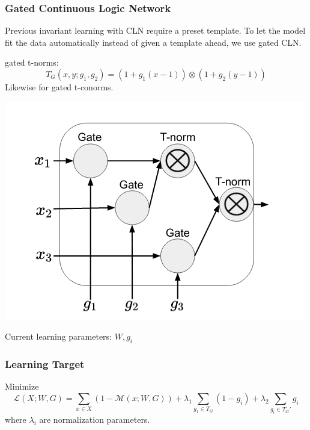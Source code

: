 \documentclass[11pt]{beamer}
\begin{document}
\begin{frame}\frametitle{Gated Continuous Logic Network}
Previous invariant learning with CLN require a preset template. To let the model fit the data automatically instead of given a template ahead, we use gated CLN.

gated t-norms:
\[T_G(x,y;g_1,g_2) = (1 + g_1(x - 1))\otimes (1 + g_2(y - 1)) \]
Likewise for gated t-conorms.

\begin{center}
\includegraphics[scale=0.35]{7.png}
\end{center}
Current learning parameters: $W, g_i$
\end{frame}
\begin{frame}\frametitle{Learning Target}
Minimize
\[\mathcal{L}(X; W,G) = \sum_{x\in X}(1 - \mathcal{M}(x; W,G)) + \lambda_1\sum_{g_1\in T_G}(1 - g_i) + \lambda_2 \sum_{g_i\in T_G' }g_i\]
where $\lambda_i$ are normalization parameters.
\end{frame}
\end{document}

